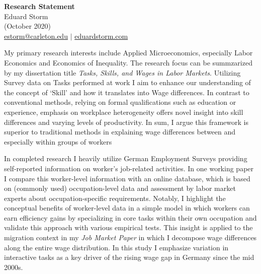 \documentclass[a4paper,11pt]{article}
\begin{document}
\thispagestyle{plain}

\begin{center}
 {\Large \textbf{Research Statement}} \\
 Eduard Storm \\
 (October 2020) \\
 \href{mailto:estorm@carleton.edu}{estorm@carleton.edu} $|$ \href{https://eduardstorm.com/}{eduardstorm.com}
\end{center}

\noindent

My primary research interests include Applied Microeconomics, especially Labor Economics and Economics of Inequality. The research focus can be summzarized by my dissertation title \textit{Tasks, Skills, and Wages in Labor Markets}. Utilizing Survey data on Tasks performed at work I aim to enhance our understanding of the concept of `Skill' and how it translates into Wage differences. In contrast to conventional methods, relying on formal qualifications such as education or experience, emphasis on workplace heterogeneity offers novel insight into skill differences and varying levels of productivity. In sum, I argue this framework is superior to traditional methods in explaining wage differences between and especially within groups of workers


In completed research I heavily utilize German Employment Surveys providing self-reported information on worker's job-related activities. In one working paper I compare this worker-level information with an online database, which is based on (commonly used) occupation-level data and assessment by labor market experts about occupation-specific requirements. Notably, I highlight the conceptual benefits of worker-level data in a simple model in which workers can earn efficiency gains by specializing in core tasks within their own occupation and validate this approach with various empirical tests. This insight is applied to the migration context in my \textit{Job Market Paper} in which I decompose wage differences along the entire wage distribution. In this study I emphasize variation in interactive tasks as a key driver of the rising wage gap in Germany since the mid 2000s. 
\end{document}
